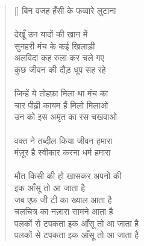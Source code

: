 \begin{verse}[\versewidth]
{बिन वजह हँसी के फव्वारे लुटाना\\
\\
देखूँ उन यादों की खान में\\
सुनहरी मंच के कई खिलाड़ी\\
अलविदा कह रुला कर चले गए\\
कुछ जीवन की दौड़ धूप सह रहे\\
\\
जिन्हें ये तोहफ़ा मिला था मंच का\\
चार पीढ़ी कायम हैं मिलो मिलाओ\\
उन को इस अमृत का रस चखवाओ\\
\\
वक्त ने तब्दील किया जीवन हमारा\\
मंज़ूर है स्वीकार करना धर्म हमारा\\
\\
मौत किसी की हो खासकर अपनों की\\
इक आँसू तो आ जाता है\\
जब एफ़ जी टी का ख्याल आता है\\
चलचित्र का नज़ारा सामने आता है\\
पलकों से टपकता इक आँसू तो आ जाता है\\
पलकों से टपकता इक आँसू तो आ जाता है
}
\end{verse}
